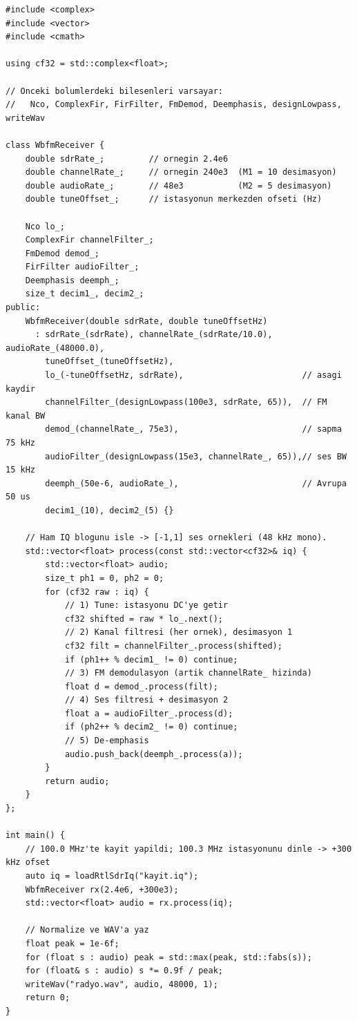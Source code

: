 \documentclass[11pt,a4paper]{article}
\begin{document}
\begin{lstlisting}
#include <complex>
#include <vector>
#include <cmath>

using cf32 = std::complex<float>;

// Onceki bolumlerdeki bilesenleri varsayar:
//   Nco, ComplexFir, FirFilter, FmDemod, Deemphasis, designLowpass, writeWav

class WbfmReceiver {
    double sdrRate_;         // ornegin 2.4e6
    double channelRate_;     // ornegin 240e3  (M1 = 10 desimasyon)
    double audioRate_;       // 48e3           (M2 = 5 desimasyon)
    double tuneOffset_;      // istasyonun merkezden ofseti (Hz)

    Nco lo_;
    ComplexFir channelFilter_;
    FmDemod demod_;
    FirFilter audioFilter_;
    Deemphasis deemph_;
    size_t decim1_, decim2_;
public:
    WbfmReceiver(double sdrRate, double tuneOffsetHz)
      : sdrRate_(sdrRate), channelRate_(sdrRate/10.0), audioRate_(48000.0),
        tuneOffset_(tuneOffsetHz),
        lo_(-tuneOffsetHz, sdrRate),                        // asagi kaydir
        channelFilter_(designLowpass(100e3, sdrRate, 65)),  // FM kanal BW
        demod_(channelRate_, 75e3),                         // sapma 75 kHz
        audioFilter_(designLowpass(15e3, channelRate_, 65)),// ses BW 15 kHz
        deemph_(50e-6, audioRate_),                         // Avrupa 50 us
        decim1_(10), decim2_(5) {}

    // Ham IQ blogunu isle -> [-1,1] ses ornekleri (48 kHz mono).
    std::vector<float> process(const std::vector<cf32>& iq) {
        std::vector<float> audio;
        size_t ph1 = 0, ph2 = 0;
        for (cf32 raw : iq) {
            // 1) Tune: istasyonu DC'ye getir
            cf32 shifted = raw * lo_.next();
            // 2) Kanal filtresi (her ornek), desimasyon 1
            cf32 filt = channelFilter_.process(shifted);
            if (ph1++ % decim1_ != 0) continue;
            // 3) FM demodulasyon (artik channelRate_ hizinda)
            float d = demod_.process(filt);
            // 4) Ses filtresi + desimasyon 2
            float a = audioFilter_.process(d);
            if (ph2++ % decim2_ != 0) continue;
            // 5) De-emphasis
            audio.push_back(deemph_.process(a));
        }
        return audio;
    }
};

int main() {
    // 100.0 MHz'te kayit yapildi; 100.3 MHz istasyonunu dinle -> +300 kHz ofset
    auto iq = loadRtlSdrIq("kayit.iq");
    WbfmReceiver rx(2.4e6, +300e3);
    std::vector<float> audio = rx.process(iq);

    // Normalize ve WAV'a yaz
    float peak = 1e-6f;
    for (float s : audio) peak = std::max(peak, std::fabs(s));
    for (float& s : audio) s *= 0.9f / peak;
    writeWav("radyo.wav", audio, 48000, 1);
    return 0;
}
\end{lstlisting}
\end{document}
